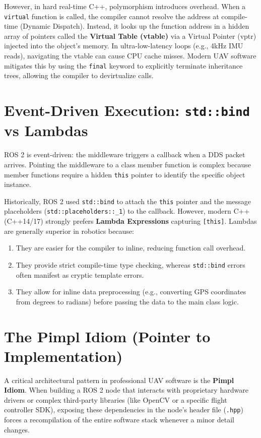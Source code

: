 \documentclass{article}
\begin{document}
However, in hard real-time C++, polymorphism introduces overhead. When a \texttt{virtual} function is called, the compiler cannot resolve the address at compile-time (Dynamic Dispatch). Instead, it looks up the function address in a hidden array of pointers called the \textbf{Virtual Table (vtable)} via a Virtual Pointer (vptr) injected into the object's memory. In ultra-low-latency loops (e.g., 4kHz IMU reads), navigating the vtable can cause CPU cache misses. Modern UAV software mitigates this by using the \texttt{final} keyword to explicitly terminate inheritance trees, allowing the compiler to devirtualize calls.

\section{Event-Driven Execution: \texttt{std::bind} vs Lambdas}
ROS 2 is event-driven: the middleware triggers a callback when a DDS packet arrives. Pointing the middleware to a class member function is complex because member functions require a hidden \texttt{this} pointer to identify the specific object instance.

Historically, ROS 2 used \texttt{std::bind} to attach the \texttt{this} pointer and the message placeholders (\texttt{std::placeholders::\_1}) to the callback. However, modern C++ (C++14/17) strongly prefers \textbf{Lambda Expressions} capturing \texttt{[this]}. Lambdas are generally superior in robotics because:
\begin{enumerate}
    \item They are easier for the compiler to inline, reducing function call overhead.
    \item They provide strict compile-time type checking, whereas \texttt{std::bind} errors often manifest as cryptic template errors.
    \item They allow for inline data preprocessing (e.g., converting GPS coordinates from degrees to radians) before passing the data to the main class logic.
\end{enumerate}

\section{The Pimpl Idiom (Pointer to Implementation)}
A critical architectural pattern in professional UAV software is the \textbf{Pimpl Idiom}. When building a ROS 2 node that interacts with proprietary hardware drivers or complex third-party libraries (like OpenCV or a specific flight controller SDK), exposing these dependencies in the node's header file (\texttt{.hpp}) forces a recompilation of the entire software stack whenever a minor detail changes.
\end{document}
